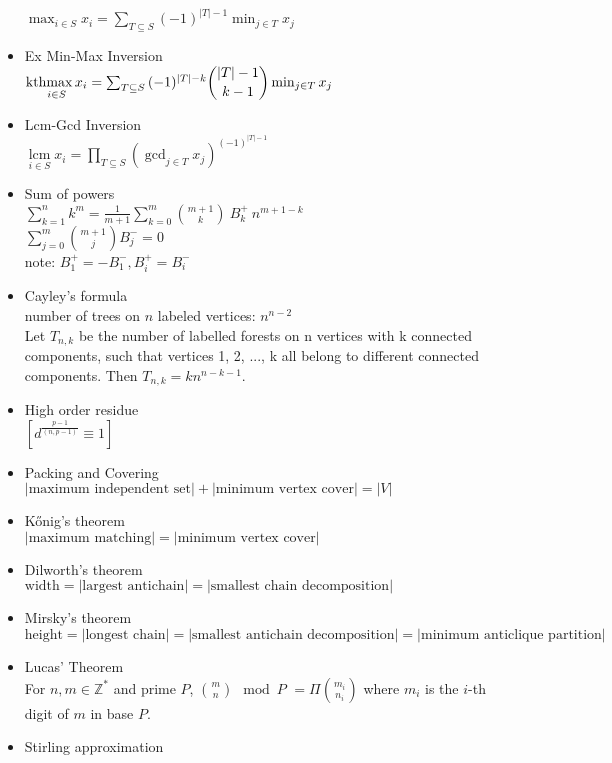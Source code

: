 \begin{itemize}
    $\max_{i\in S}{x_i}=\sum_{T\subseteq S}{(-1)^{|T|-1}\min_{j\in T}{x_j}}$
  \item Ex Min-Max Inversion\\
      $\underset{i\in S}{\operatorname{kthmax}{x_i}}=\sum_{T\subseteq S}{(-1)^{|T|-k}\dbinom {|T|-1}{k-1}\min_{j\in T}{x_j}}$
  \item Lcm-Gcd Inversion\\
      $\underset{i\in S}{\operatorname{lcm}}{x_i}=\prod_{T\subseteq S}{\left(\gcd_{j\in T}{x_j} \right)^{(-1)^{|T|-1}}}$
  \item Sum of powers\\
      $\sum_{k=1}^{n} k^m=\frac{1}{m+1}\sum_{k=0}^{m}{{m+1}\choose{k}}~B^+_k~n^{m+1-k}$\\
      $\sum_{j=0}^{m}{m+1\choose j}B^-_j=0$\\
      note: $B^+_1=-B^-_1, B^+_i=B^-_i$
  \item Cayley's formula \\
    number of trees on $n$ labeled vertices: $n^{n-2}$ \\
    Let $T_{n,k}$ be the number of labelled forests on n vertices with k connected components, such that vertices 1, 2, ..., k all belong to different connected components. Then $T_{n,k} = k n^{n-k-1}.$
  \item High order residue\\
    $[d^{\frac{p-1}{(n,p-1)}}\equiv 1]$
  \item Packing and Covering\\
    $|\mbox{maximum independent set}| + |\mbox{minimum vertex cover}| = |V|$
  \item Kőnig's theorem\\
    $|\mbox{maximum matching}| = |\mbox{minimum vertex cover}|$
  \item Dilworth's theorem\\
    $\mbox{width} = |\mbox{largest antichain}| = |\mbox{smallest chain decomposition}|$
  \item Mirsky's theorem\\
    $\mbox{height} = |\mbox{longest chain}| = |\mbox{smallest antichain decomposition}| = |\mbox{minimum anticlique partition}|$
  \item Lucas’ Theorem\\
    For $n, m \in \mathbb{Z}^{*}$ and prime $P$,
    ${m \choose n} \mod P$
      $= \Pi {m_i \choose n_i}$
    where $m_i$ is the $i$-th digit of $m$ in base $P$.
  \item Stirling approximation\\

\end{itemize}
